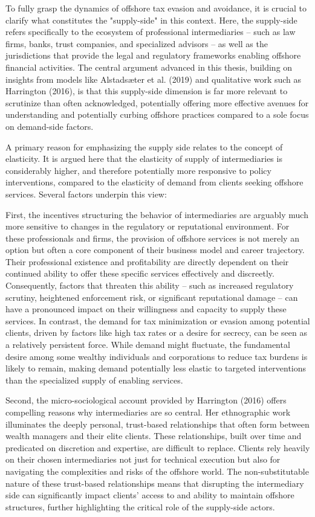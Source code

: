 To fully grasp the dynamics of offshore tax evasion and avoidance, it is crucial to clarify what constitutes the "supply-side" in this context. Here, the supply-side refers specifically to the ecosystem of professional intermediaries – such as law firms, banks, trust companies, and specialized advisors – as well as the jurisdictions that provide the legal and regulatory frameworks enabling offshore financial activities. The central argument advanced in this thesis, building on insights from models like Alstadsæter et al. (2019) and qualitative work such as Harrington (2016), is that this supply-side dimension is far more relevant to scrutinize than often acknowledged, potentially offering more effective avenues for understanding and potentially curbing offshore practices compared to a sole focus on demand-side factors.

A primary reason for emphasizing the supply side relates to the concept of elasticity. It is argued here that the elasticity of supply of intermediaries is considerably higher, and therefore potentially more responsive to policy interventions, compared to the elasticity of demand from clients seeking offshore services. Several factors underpin this view:

First, the incentives structuring the behavior of intermediaries are arguably much more sensitive to changes in the regulatory or reputational environment. For these professionals and firms, the provision of offshore services is not merely an option but often a core component of their business model and career trajectory. Their professional existence and profitability are directly dependent on their continued ability to offer these specific services effectively and discreetly. Consequently, factors that threaten this ability – such as increased regulatory scrutiny, heightened enforcement risk, or significant reputational damage – can have a pronounced impact on their willingness and capacity to supply these services. In contrast, the demand for tax minimization or evasion among potential clients, driven by factors like high tax rates or a desire for secrecy, can be seen as a relatively persistent force. While demand might fluctuate, the fundamental desire among some wealthy individuals and corporations to reduce tax burdens is likely to remain, making demand potentially less elastic to targeted interventions than the specialized supply of enabling services.

Second, the micro-sociological account provided by Harrington (2016) offers compelling reasons why intermediaries are so central. Her ethnographic work illuminates the deeply personal, trust-based relationships that often form between wealth managers and their elite clients. These relationships, built over time and predicated on discretion and expertise, are difficult to replace. Clients rely heavily on their chosen intermediaries not just for technical execution but also for navigating the complexities and risks of the offshore world. The non-substitutable nature of these trust-based relationships means that disrupting the intermediary side can significantly impact clients' access to and ability to maintain offshore structures, further highlighting the critical role of the supply-side actors.

